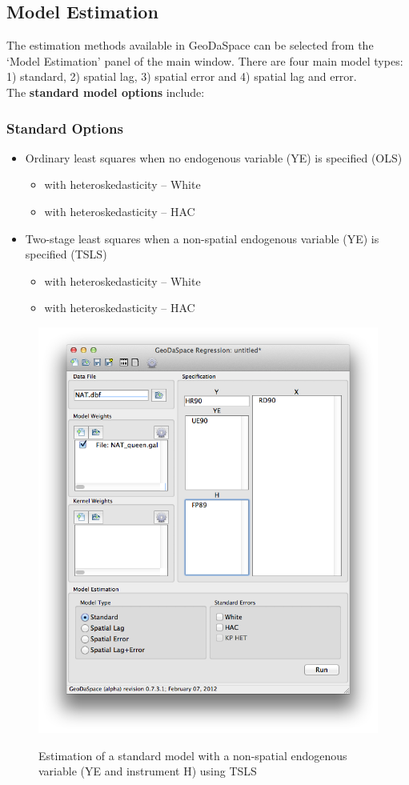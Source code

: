 \documentclass{article}
\begin{document}
\subsection{Model Estimation}
The estimation methods available in GeoDaSpace can be selected from the `Model Estimation' panel of the main window. There are four main model types: 1) standard, 2) spatial lag, 3) spatial error and 4) spatial lag and error. \\

The \textbf{standard model options} include:

\subsubsection*{Standard Options}
\begin{itemize}
      \item Ordinary least squares when no endogenous variable (YE) is specified (OLS)
     \begin{itemize}
          \item with heteroskedasticity -- White
          \item with heteroskedasticity -- HAC
      \end{itemize}
     \item Two-stage least squares  when a non-spatial endogenous variable (YE) is specified (TSLS)
      \begin{itemize}
          \item with heteroskedasticity -- White
          \item with heteroskedasticity -- HAC
         \end{itemize}
\end{itemize}

\begin{figure}[htb]
\begin{center}
\includegraphics[width=0.7\linewidth]{tsls.png}\\
\caption{Estimation of a standard model with a non-spatial endogenous variable (YE and instrument H) using TSLS}
\label{f:tsls}
\end{center}
\end{figure}
\end{document}
